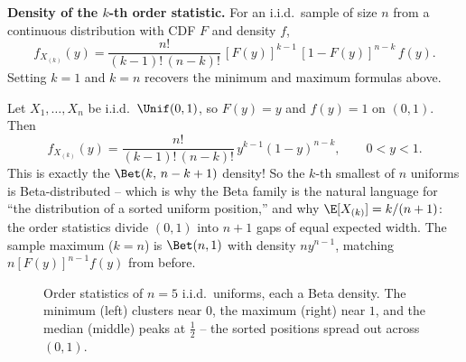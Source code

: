 \begin{formalbox}
\textbf{Density of the $k$-th order statistic.} For an i.i.d.\ sample of size $n$ from a
continuous distribution with CDF $F$ and density $f$,
\[
  f_{X_{(k)}}(y) = \frac{n!}{(k-1)!\,(n-k)!}\,[F(y)]^{k-1}\,[1-F(y)]^{n-k}\,f(y).
\]
Setting $k=1$ and $k=n$ recovers the minimum and maximum formulas above.
\end{formalbox}

\begin{example}
\label{ch16:unif-order-beta}
Let $X_1,\dots,X_n$ be i.i.d.\ $\Unif(0,1)$, so $F(y)=y$ and $f(y)=1$ on $(0,1)$. Then
\[
  f_{X_{(k)}}(y) = \frac{n!}{(k-1)!\,(n-k)!}\,y^{k-1}(1-y)^{n-k}, \qquad 0<y<1.
\]
This is exactly the $\Bet(k,\,n-k+1)$ density! So the $k$-th smallest of $n$ uniforms is
Beta-distributed -- which is why the Beta family is the natural language for ``the
distribution of a sorted uniform position,'' and why $\E[X_{(k)}] = k/(n+1)$: the order
statistics divide $(0,1)$ into $n+1$ gaps of equal expected width. The sample maximum
($k=n$) is $\Bet(n,1)$ with density $n y^{n-1}$, matching $n[F(y)]^{n-1}f(y)$ from before.
\end{example}

\begin{figure}[H]
\centering
{}
\caption{Order statistics of $n=5$ i.i.d.\ uniforms, each a Beta density. The minimum
(left) clusters near $0$, the maximum (right) near $1$, and the median (middle) peaks at
$\tfrac12$ -- the sorted positions spread out across $(0,1)$.}
\label{ch16:fig-order}
\end{figure}

